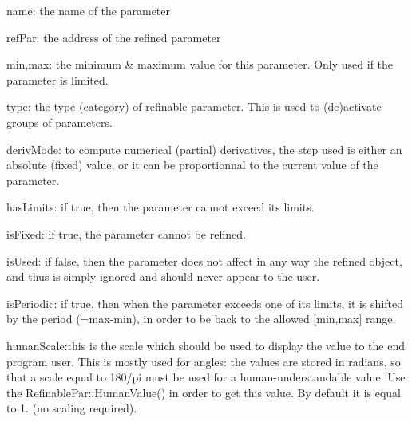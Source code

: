 \begin{DoxyParagraph}{name\+: the name of the parameter}

\end{DoxyParagraph}
\begin{DoxyParagraph}{ref\+Par\+: the address of the refined parameter}

\end{DoxyParagraph}
\begin{DoxyParagraph}{min,max\+: the minimum \& maximum value for this parameter. Only used}
if the parameter is limited. 
\end{DoxyParagraph}
\begin{DoxyParagraph}{type\+: the type (category) of refinable parameter. This is used to (de)activate}
groups of parameters. 
\end{DoxyParagraph}
\begin{DoxyParagraph}{deriv\+Mode\+: to compute numerical (partial) derivatives, the step used is either}
an absolute (fixed) value, or it can be proportionnal to the current value of the parameter. 
\end{DoxyParagraph}
\begin{DoxyParagraph}{has\+Limits\+: if true, then the parameter cannot exceed its limits.}

\end{DoxyParagraph}
\begin{DoxyParagraph}{is\+Fixed\+: if true, the parameter cannot be refined.}

\end{DoxyParagraph}
\begin{DoxyParagraph}{is\+Used\+: if false, then the parameter does not affect in any way the refined object,}
and thus is simply ignored and should never appear to the user. 
\end{DoxyParagraph}
\begin{DoxyParagraph}{is\+Periodic\+: if true, then when the parameter exceeds one of its limits, it is}
shifted by the period (=max-\/min), in order to be back to the allowed \mbox{[}min,max\mbox{]} range. 
\end{DoxyParagraph}
\begin{DoxyParagraph}{human\+Scale\+:this is the scale which should be used to display the value to the}
end program user. This is mostly used for angles\+: the values are stored in radians, so that a scale equal to 180/pi must be used for a \textquotesingle{}human-\/understandable\textquotesingle{} value. Use the Refinable\+Par\+::\+Human\+Value() in order to get this value. By default it is equal to 1. (no scaling required). 
\end{DoxyParagraph}
\mbox{\label{class_obj_cryst_1_1_refinable_par_abd6a06bbb5eb59d80515ebdad2612da8}} 
